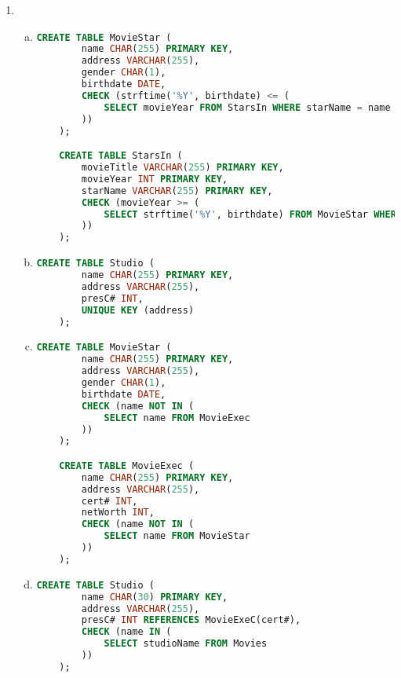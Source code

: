 \documentclass[12pt]{article}
\begin{document}
\begin{enumerate}[1.]
    \item

    \begin{enumerate}[a)]
        \item
    \begin{lstlisting}[language=SQL]
    CREATE TABLE MovieStar (
        name CHAR(255) PRIMARY KEY,
        address VARCHAR(255),
        gender CHAR(1),
        birthdate DATE,
        CHECK (strftime('%Y', birthdate) <= (
            SELECT movieYear FROM StarsIn WHERE starName = name
        ))
    );

    CREATE TABLE StarsIn (
        movieTitle VARCHAR(255) PRIMARY KEY,
        movieYear INT PRIMARY KEY,
        starName VARCHAR(255) PRIMARY KEY,
        CHECK (movieYear >= (
            SELECT strftime('%Y', birthdate) FROM MovieStar WHERE starName = name
        ))
    );
    \end{lstlisting}

        \item

    \begin{lstlisting}[language=SQL]
    CREATE TABLE Studio (
        name CHAR(255) PRIMARY KEY,
        address VARCHAR(255),
        presC# INT,
        UNIQUE KEY (address)
    );
    \end{lstlisting}

        \item

    \begin{lstlisting}[language=SQL]
    CREATE TABLE MovieStar (
        name CHAR(255) PRIMARY KEY,
        address VARCHAR(255),
        gender CHAR(1),
        birthdate DATE,
        CHECK (name NOT IN (
            SELECT name FROM MovieExec
        ))
    );

    CREATE TABLE MovieExec (
        name CHAR(255) PRIMARY KEY,
        address VARCHAR(255),
        cert# INT,
        netWorth INT,
        CHECK (name NOT IN (
            SELECT name FROM MovieStar
        ))
    );
    \end{lstlisting}

        \item

    \begin{lstlisting}[language=SQL]
    CREATE TABLE Studio (
        name CHAR(30) PRIMARY KEY,
        address VARCHAR(255),
        presC# INT REFERENCES MovieExeC(cert#),
        CHECK (name IN (
            SELECT studioName FROM Movies
        ))
    );


\end{lstlisting}
\end{enumerate}
\end{enumerate}
\end{document}
